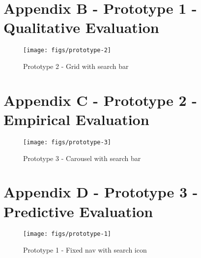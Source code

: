 \section{Appendix B - Prototype 1 - Qualitative Evaluation}

\begin{figure}[H]
  \centering
  \texttt{[image: figs/prototype-2]}
  \caption{Prototype 2 - Grid with search bar}
  \label{fig::1}
\end{figure}

\section{Appendix C - Prototype 2 - Empirical Evaluation}

\begin{figure}[H]
  \centering
  \texttt{[image: figs/prototype-3]}
  \caption{Prototype 3 - Carousel with search bar}
  \label{fig::1}
\end{figure}

\section{Appendix D - Prototype 3 - Predictive Evaluation}

\begin{figure}[H]
  \centering
  \texttt{[image: figs/prototype-1]}
  \caption{Prototype 1 - Fixed nav with search icon}
  \label{fig::1}
\end{figure}


